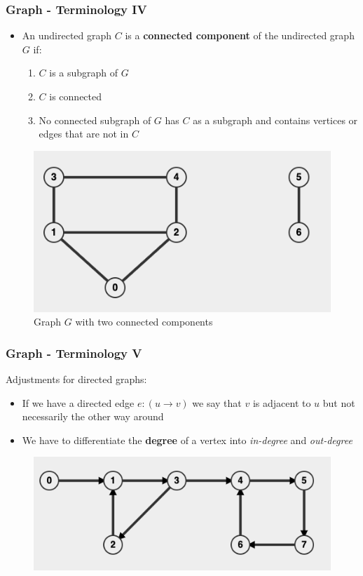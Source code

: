 \documentclass{beamer}
\begin{document}
\begin{frame}
\frametitle{Graph - Terminology IV}
\begin{itemize}
\item
An undirected graph $C$ is a \textbf{connected component} of the undirected graph $G$ if:
	\begin{enumerate}
	\item
	$C$ is a subgraph of $G$
	\item
	$C$ is connected
	\item
	No connected subgraph of $G$ has $C$ as a subgraph and contains vertices or edges that are not in $C$
	\end{enumerate}
\end{itemize}
	\vspace{0.4cm}
	
	\begin{figure}
	\centering
	\includegraphics[scale=0.25]{imgs/2.4/graph/connected-components.png}
	\caption{Graph $G$ with two connected components}
	
	\end{figure}
\end{frame}

\begin{frame}
\frametitle{Graph - Terminology V}
Adjustments for directed graphs:
\begin{itemize}
	\item If we have a directed edge $e: (u\rightarrow v)$ we say that $v$ is adjacent to $u$ but not necessarily the other way around
	\item We have to differentiate the \textbf{degree} of a vertex into \textit{in-degree} and \textit{out-degree}
\end{itemize}

\begin{figure}
    \centering
    \includegraphics[scale=0.3]{imgs/2.4/graph/directed-graph.png}
\end{figure}

\end{frame}
\end{document}

